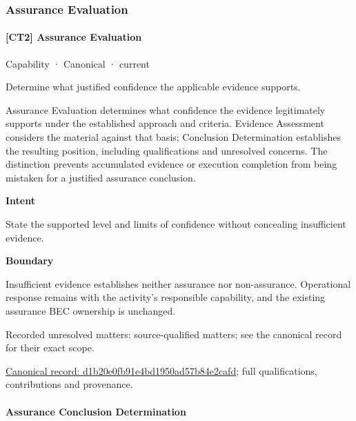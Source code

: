 \subsubsection{Assurance Evaluation}

\paragraph{[CT2] Assurance Evaluation}

\label{element:d1b20e0fb91e4bd1950ad57b84e2cafd}
{\small Capability · Canonical · current}\par

Determine what justified confidence the applicable evidence supports.



Assurance Evaluation determines what confidence the evidence legitimately supports under the established approach and criteria. Evidence Assessment considers the material against that basis; Conclusion Determination establishes the resulting position, including qualifications and unresolved concerns. The distinction prevents accumulated evidence or execution completion from being mistaken for a justified assurance conclusion.



\textbf{Intent}



State the supported level and limits of confidence without concealing insufficient evidence.



\textbf{Boundary}



Insufficient evidence establishes neither assurance nor non-assurance. Operational response remains with the activity's responsible capability, and the existing assurance BEC ownership is unchanged.


{\small Recorded unresolved matters: source-qualified matters; see the canonical record for their exact scope.}\par
{\footnotesize \href{../../../../continuum/strategy/capability/d1b20e0fb91e4bd1950ad57b84e2cafd.md}{Canonical record: d1b20e0fb91e4bd1950ad57b84e2cafd}; full qualifications, contributions and provenance.}\par
\paragraph{Assurance Conclusion Determination}

